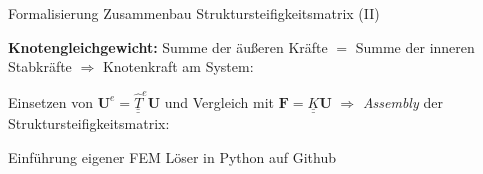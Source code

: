 \documentclass[aspectratio=169,professionalfonts]{beamer}
\begin{document}
\begin{frame}{Formalisierung Zusammenbau Struktursteifigkeitsmatrix (II)}
\small

\textbf{Knotengleichgewicht:} Summe der äußeren Kräfte $=$ Summe der inneren Stabkräfte $\Rightarrow$ Knotenkraft am System:

\vspace{0.4em}
\centering
{}

\vspace{0.6em}
\raggedright
Einsetzen von $\mathbf{U}^{e}=\underline{\underline{\hat{T}}}^{e}\mathbf{U}$ und Vergleich mit $\mathbf{F}=\underline{\underline{K}}\mathbf{U}$ $\Rightarrow$ \textit{Assembly} der Struktursteifigkeitsmatrix:

\vspace{0.4em}
\centering
{}

\end{frame}

\begin{frame}{Einführung eigener FEM Löser in Python auf Github}
  \centering
\end{frame}
\end{document}
